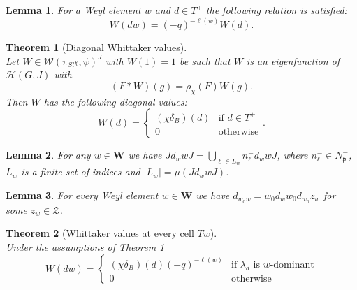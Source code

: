 \documentclass[10pt,a4paper]{amsart}
\newtheorem{lemma}{Lemma}
\newtheorem{theorem}{Theorem}
\begin{document}
\begin{lemma} \label{permlem}
         For a Weyl element $w$ and $d\in T^+$ the following relation is satisfied:
 $$W(dw)=(-q)^{-\ell(w)}W(d).$$
\end{lemma}

\begin{theorem}[Diagonal Whittaker values] \label{diagon} ~\\
 Let $W\in \mathcal{W}(\pi_{St^{\chi}},\psi)^{J}$ with $W(1)=1$ be such that $W$ is an eigenfunction of $\mathcal{H}(G,J)$ with $$(F*W)(g)=\rho_{\chi}(F)W(g).$$
	Then $W$ has the following diagonal values:
$$W(d)=\begin{cases}
       (\chi\delta_B)(d)  & \text{if $d\in T^+$} \\
        0 & \text{otherwise} 
    \end{cases}.$$
 \end{theorem}

\begin{lemma} \label{diagcos}
  For any $w\in\mathbf{W}$ we have $Jd_wwJ=\underset{\ell\in L_w}{\bigcup}n_{\ell}^-d_wwJ$, where $n_{\ell}^-\in N^-_{\mathfrak{p}}$, $L_w$ is a finite set of indices and $|L_w|=\mu(Jd_wwJ)$.
\end{lemma}

\begin{lemma}\label{aux}
    For every Weyl element $w\in\mathbf{W}$ we have $d_{w_0w}=w_0d_ww_0d_{w_0}z_w$ for some $z_w\in\mathcal{Z}$.
\end{lemma}

\begin{theorem}[Whittaker values at every cell $Tw$] \label{main} ~\\
Under the assumptions of Theorem \ref{diagon}
    $$W(dw)=\begin{cases}
      (\chi\delta_B)(d)(-q)^{-\ell(w)}  & \text{if $\lambda_d$ is $w$-dominant} \\
        0 & \text{otherwise} 
    \end{cases}$$
\end{theorem}
\end{document}
